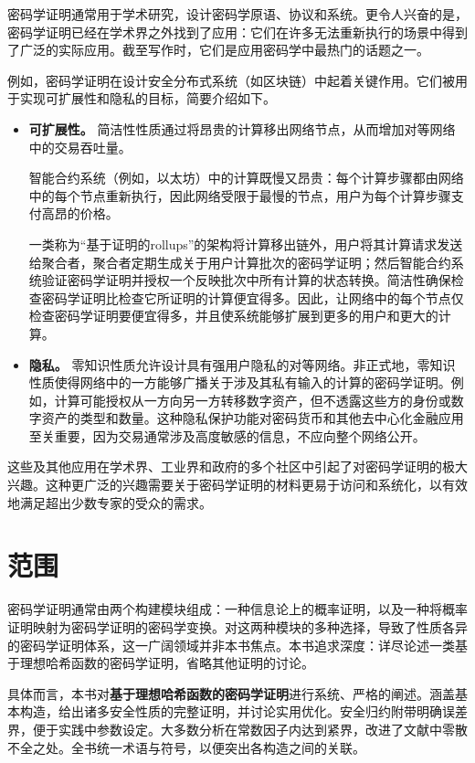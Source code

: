 \documentclass[american,singlepageview]{snargs-book-zh}
\begin{document}
密码学证明通常用于学术研究，设计密码学原语、协议和系统。更令人兴奋的是，密码学证明已经在学术界之外找到了应用：它们在许多无法重新执行的场景中得到了广泛的实际应用。截至写作时，它们是应用密码学中最热门的话题之一。

例如，密码学证明在设计安全分布式系统（如区块链）中起着关键作用。它们被用于实现可扩展性和隐私的目标，简要介绍如下。
\begin{itemize}

  \item \textbf{可扩展性。}
  简洁性性质通过将昂贵的计算移出网络节点，从而增加对等网络中的交易吞吐量。

  智能合约系统（例如，以太坊）中的计算既慢又昂贵：每个计算步骤都由网络中的每个节点重新执行，因此网络受限于最慢的节点，用户为每个计算步骤支付高昂的价格。

  一类称为“基于证明的rollups”的架构将计算移出链外，用户将其计算请求发送给聚合者，聚合者定期生成关于用户计算批次的密码学证明；然后智能合约系统验证密码学证明并授权一个反映批次中所有计算的状态转换。简洁性确保检查密码学证明比检查它所证明的计算便宜得多。因此，让网络中的每个节点仅检查密码学证明要便宜得多，并且使系统能够扩展到更多的用户和更大的计算。

  \item \textbf{隐私。}
  零知识性质允许设计具有强用户隐私的对等网络。非正式地，零知识性质使得网络中的一方能够广播关于涉及其私有输入的计算的密码学证明。例如，计算可能授权从一方向另一方转移数字资产，但不透露这些方的身份或数字资产的类型和数量。这种隐私保护功能对密码货币和其他去中心化金融应用至关重要，因为交易通常涉及高度敏感的信息，不应向整个网络公开。

\end{itemize}
这些及其他应用在学术界、工业界和政府的多个社区中引起了对密码学证明的极大兴趣。这种更广泛的兴趣需要关于密码学证明的材料更易于访问和系统化，以有效地满足超出少数专家的受众的需求。

\cleardoublepage

\section[nonumber=true]{范围}

密码学证明通常由两个构建模块组成：一种信息论上的概率证明，以及一种将概率证明映射为密码学证明的密码学变换。对这两种模块的多种选择，导致了性质各异的密码学证明体系，这一广阔领域并非本书焦点。本书追求深度：详尽论述一类基于理想哈希函数的密码学证明，省略其他证明的讨论。

具体而言，本书对\textbf{基于理想哈希函数的密码学证明}进行系统、严格的阐述。涵盖基本构造，给出诸多安全性质的完整证明，并讨论实用优化。安全归约附带明确误差界，便于实践中参数设定。大多数分析在常数因子内达到紧界，改进了文献中零散不全之处。全书统一术语与符号，以便突出各构造之间的关联。
\end{document}
